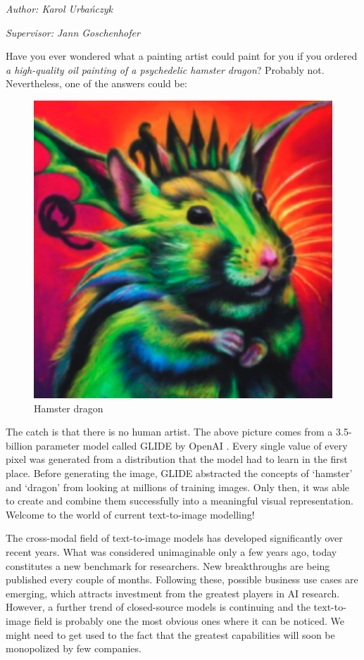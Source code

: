 \documentclass[
]{krantz}
\begin{document}
\emph{Author: Karol Urbańczyk}

\emph{Supervisor: Jann Goschenhofer}

Have you ever wondered what a painting artist could paint for you if you ordered \emph{a high-quality oil painting of a psychedelic hamster dragon}? Probably not. Nevertheless, one of the answers could be:

\begin{figure}

{\centering \includegraphics[width=0.4\linewidth]{figures/02-02-text-2-img/hamsterdragon} 

}

\caption{Hamster dragon}\label{fig:hamsterdragon}
\end{figure}

The catch is that there is no human artist. The above picture comes from a 3.5-billion parameter model called GLIDE by OpenAI \citep{Glide2021}. Every single value of every pixel was generated from a distribution that the model had to learn in the first place. Before generating the image, GLIDE abstracted the concepts of `hamster' and `dragon' from looking at millions of training images. Only then, it was able to create and combine them successfully into a meaningful visual representation. Welcome to the world of current text-to-image modelling!

The cross-modal field of text-to-image models has developed significantly over recent years. What was considered unimaginable only a few years ago, today constitutes a new benchmark for researchers. New breakthroughs are being published every couple of months. Following these, possible business use cases are emerging, which attracts investment from the greatest players in AI research. However, a further trend of closed-source models is continuing and the text-to-image field is probably one the most obvious ones where it can be noticed. We might need to get used to the fact that the greatest capabilities will soon be monopolized by few companies.
\end{document}
